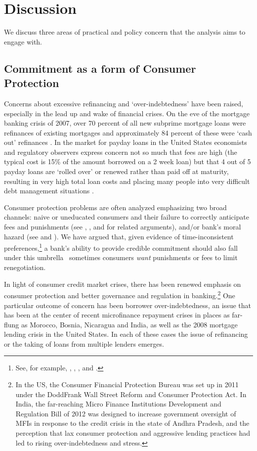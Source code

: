 \documentclass[11pt,english]{article}
\theoremstyle{plain}
\theoremstyle{definition}
\begin{document}
\section{Discussion}

We discuss three areas of practical and policy concern that the
analysis aims to engage with.

\subsection{Commitment as a form of Consumer Protection}

Concerns about excessive refinancing and `over-indebtedness' have
been raised, especially in the lead up and wake of financial crises.
On the eve of the mortgage banking crisis of 2007, over 70 percent
of all new subprime mortgage loans were refinances of existing mortgages
and approximately 84 percent of these were `cash out' refinances \citep{demyanyk2011}.
In the market for payday loans in the United States economists and
regulatory observers express concern not so much that fees are high
(the typical cost is 15\% of the amount borrowed on a 2 week loan)
but that 4 out of 5 payday loans are `rolled over' or renewed
rather than paid off at maturity, resulting in very high total loan costs and placing
many people into very difficult debt management situations \citep{deyoung2015}.

Consumer protection problems are often analyzed emphasizing two
broad channels: naive or uneducated consumers and their failure to correctly
anticipate fees and punishments (see \citet{gabaix2006},
\citet{armstrong2012}, and \citet{akerlof2015} for related arguments),
and/or bank's moral hazard (see \citet{dewatripont1999} and \citet{oak2010}).
We have argued that, given evidence of time-inconsistent
preferences,\footnote{See, for example, \citet{laibson2003}, \citet{ashraf2006},
\citet{gugerty2007}, and \citet{tanaka2010}.} a bank's ability to provide credible commitment should also fall
under this umbrella \textendash\  sometimes consumers \textit{want} punishments
or fees to limit renegotiation.

In light of consumer credit
market crises, there has been renewed emphasis on consumer protection and
better governance and regulation in banking.\footnote{In the US, the Consumer Financial Protection Bureau was set up in
2011 under the Dodd\textendash Frank Wall Street Reform and Consumer
Protection Act. In India, the far-reaching Micro Finance Institutions
Development and Regulation Bill of 2012 was designed to increase government
oversight of MFIs in response to the credit crisis in the state of
Andhra Pradesh, and the perception that lax consumer protection and
aggressive lending practices had led to rising over-indebtedness and
stress.} One particular outcome of concern has been borrower over-indebtedness,
an issue that has been at the center of recent microfinance repayment
crises in places as far-flung as Morocco, Bosnia, Nicaragua and India,
as well as the 2008 mortgage lending crisis in the United States.
In each of these cases the issue of refinancing or the taking of loans
from multiple lenders emerges.
\end{document}
